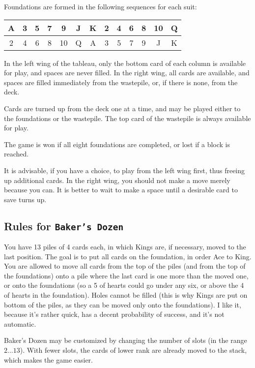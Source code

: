 Foundations are formed in the following sequences for
each suit:

\smallskip
\begin{tabular}{|c|c|c|c|c|c|c|c|c|c|c|c|c|}
\hline
          A&3&5&7&9&J&K&2&4&6&8&10&Q\\
\hline
          2&4&6&8&10&Q&A&3&5&7&9&J&K\\
\hline
\end{tabular}

\smallskip
In the left wing of the tableau, only the bottom card
of each column is available for play, and spaces are
never filled.  In the right wing, all cards are
available, and spaces are filled immediately from the
wastepile, or, if there is none, from the deck.

Cards are turned up from the deck one at a time, and
may be played either to the foundations or the
wastepile.  The top card of the wastepile is always
available for play.

The game is won if all eight foundations are
completed, or lost if a block is reached.

It is advisable, if you have a choice, to play from
the left wing first, thus freeing up additional cards.
In the right wing, you should not make a move merely
because you can.  It is better to wait to make a space
until a desirable card to save turns up.

\subsection{Rules for {\tt Baker's Dozen}}
You have 13 piles of 4 cards each, in which Kings are,
if necessary, moved to the last position. The goal is
to put all cards on the foundation, in order Ace to King.
You are allowed to move all cards from the top of the
piles (and from the top of the foundations) onto a pile
where the last card is one more than the moved one, or onto
the foundations (so a 5 of hearts could go under any six, or above the 4
of hearts in the foundation). Holes cannot be filled
(this is why Kings are put on bottom of the piles, as they
can be moved only onto the foundations). I like it, because
it's rather quick, has a decent probability of success,
and it's not automatic.

Baker's Dozen may be customized by changing the number
of slots (in the range $2\ldots 13$). With fewer slots, the
cards of lower rank are already moved to the stack,
which makes the game easier.

